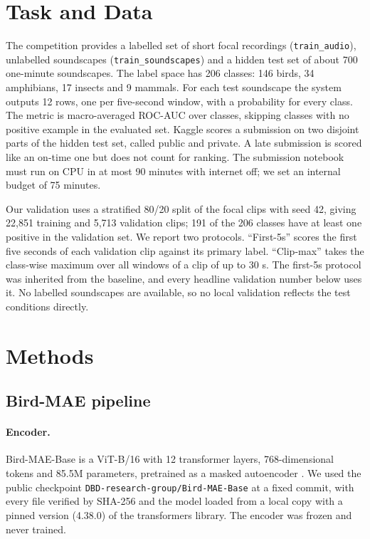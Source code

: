 \documentclass[letterpaper]{article} %
\begin{document}
\section{Task and Data}
The competition provides a labelled set of short focal recordings (\texttt{train\_audio}), unlabelled soundscapes (\texttt{train\_soundscapes}) and a hidden test set of about 700 one-minute soundscapes. The label space has 206 classes: 146 birds, 34 amphibians, 17 insects and 9 mammals. For each test soundscape the system outputs 12 rows, one per five-second window, with a probability for every class. The metric is macro-averaged ROC-AUC over classes, skipping classes with no positive example in the evaluated set. Kaggle scores a submission on two disjoint parts of the hidden test set, called public and private. A late submission is scored like an on-time one but does not count for ranking. The submission notebook must run on CPU in at most 90 minutes with internet off; we set an internal budget of 75 minutes.

Our validation uses a stratified 80/20 split of the focal clips with seed 42, giving 22,851 training and 5,713 validation clips; 191 of the 206 classes have at least one positive in the validation set. We report two protocols. ``First-5s'' scores the first five seconds of each validation clip against its primary label. ``Clip-max'' takes the class-wise maximum over all windows of a clip of up to 30 s. The first-5s protocol was inherited from the baseline, and every headline validation number below uses it. No labelled soundscapes are available, so no local validation reflects the test conditions directly.

\section{Methods}
\subsection{Bird-MAE pipeline}
\paragraph{Encoder.}
Bird-MAE-Base is a ViT-B/16 with 12 transformer layers, 768-dimensional tokens and 85.5M parameters, pretrained as a masked autoencoder \citep{rauch2025can}. We used the public checkpoint \texttt{DBD-research-group/Bird-MAE-Base} at a fixed commit, with every file verified by SHA-256 and the model loaded from a local copy with a pinned version (4.38.0) of the transformers library. The encoder was frozen and never trained.
\end{document}
